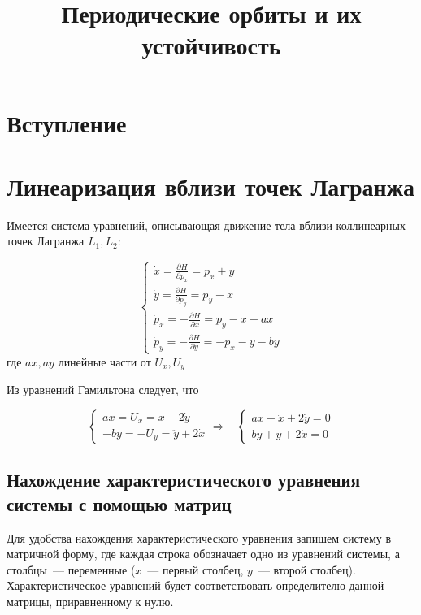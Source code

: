 \documentclass[12pt, a4paper]{article}
\title{Периодические орбиты и их устойчивость}
\date{}
\author{}
\begin{document}
\maketitle
\tableofcontents
\newpage
\section{Вступление}

\section{Линеаризация вблизи точек Лагранжа}

Имеется система уравнений, описывающая движение тела вблизи коллинеарных точек Лагранжа  $L_1, L_2$:

\begin{equation}
\label{eq:linear}
    \begin{cases}
        \dot x = \frac{\partial H}{\partial p_x} = p_x + y\\
        \dot y = \frac{\partial H}{\partial p_y} = p_y - x\\
        \dot p_x = - \frac{\partial H}{\partial x} = p_y - x + ax\\
        \dot p_y = - \frac{\partial H}{\partial y} = - p_x - y - by
    \end{cases}
\end{equation}
где $ax, ay$ линейные части от $U_x, U_y$

Из уравнений Гамильтона следует, что 

\begin{equation}
\label{u_xy}
    \begin{cases}
        ax = U_x = \ddot x - 2 \dot y\\
        - by = - U_y = \ddot y + 2 \dot x 
    \end{cases}
    \Rightarrow
    \;\;\;
    \begin{cases}
         ax - \ddot x + 2 \dot y = 0\\
         by + \ddot y + 2 \dot x = 0
    \end{cases}
\end{equation}

\subsection{Нахождение характеристического уравнения системы с помощью матриц}

Для удобства нахождения характеристического уравнения запишем систему в матричной форму, где каждая строка обозначает одно из уравнений системы, а столбцы~--- переменные ($x$~---  первый столбец, $y$~--- второй столбец). Характеристическое уравнений будет соответствовать определителю данной матрицы, приравненному к нулю.\\ 
\end{document}
